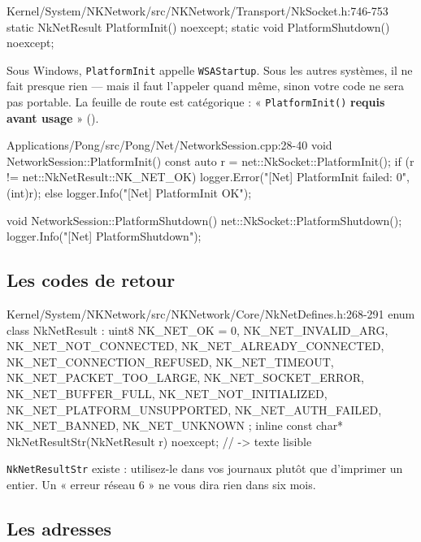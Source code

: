 \begin{nkcode}{Kernel/System/NKNetwork/src/NKNetwork/Transport/NkSocket.h:746-753}
static NkNetResult PlatformInit() noexcept;
static void PlatformShutdown() noexcept;
\end{nkcode}

Sous Windows, \texttt{PlatformInit} appelle \texttt{WSAStartup}. Sous les autres
systèmes, il ne fait presque rien — mais il faut l'appeler quand même, sinon
votre code ne sera pas portable. La feuille de route est catégorique :
« \texttt{PlatformInit()} \textbf{requis avant usage} » ().

\begin{nkcode}{Applications/Pong/src/Pong/Net/NetworkSession.cpp:28-40}
        void NetworkSession::PlatformInit() {
            const auto r = net::NkSocket::PlatformInit();
            if (r != net::NkNetResult::NK_NET_OK) {
                logger.Error("[Net] PlatformInit failed: {0}", (int)r);
            } else {
                logger.Info("[Net] PlatformInit OK");
            }
        }

        void NetworkSession::PlatformShutdown() {
            net::NkSocket::PlatformShutdown();
            logger.Info("[Net] PlatformShutdown");
        }
\end{nkcode}

\subsection{Les codes de retour}

\begin{nkcode}{Kernel/System/NKNetwork/src/NKNetwork/Core/NkNetDefines.h:268-291}
enum class NkNetResult : uint8 {
    NK_NET_OK = 0, NK_NET_INVALID_ARG, NK_NET_NOT_CONNECTED, NK_NET_ALREADY_CONNECTED,
    NK_NET_CONNECTION_REFUSED, NK_NET_TIMEOUT, NK_NET_PACKET_TOO_LARGE, NK_NET_SOCKET_ERROR,
    NK_NET_BUFFER_FULL, NK_NET_NOT_INITIALIZED, NK_NET_PLATFORM_UNSUPPORTED,
    NK_NET_AUTH_FAILED, NK_NET_BANNED, NK_NET_UNKNOWN
};
inline const char* NkNetResultStr(NkNetResult r) noexcept;   // -> texte lisible
\end{nkcode}

\texttt{NkNetResultStr} existe : utilisez-le dans vos journaux plutôt que
d'imprimer un entier. Un « erreur réseau 6 » ne vous dira rien dans six mois.

\subsection{Les adresses}

